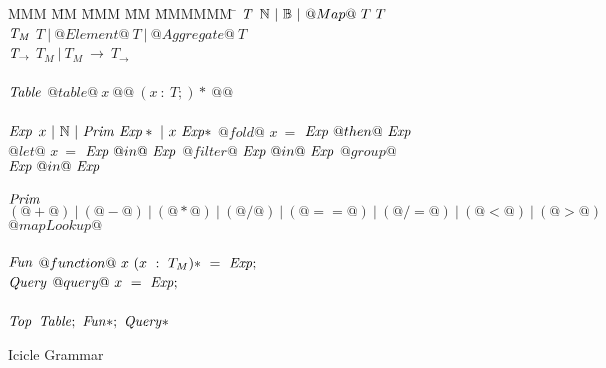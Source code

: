 
\begin{figure}

\begin{tabbing}
MMM \= MM \= MMM \= MM \= MMMMMM \= \kill
$\mathit{T}$
\GrammarDef
  $\mathbb{N}~|~\mathbb{B}~|~@Map@~T~T$
\\
$\mathit{T_M}$
\GrammarDef
  $T~|~@Element@~T~|~@Aggregate@~T$
\\
$\mathit{T_\to}$
\GrammarDef
  $T_M ~|~ T_M~\to~T_\to$
\\
\\

$\mathit{Table}$
\GrammarDef
  $@table@~x~@{@~(x~:~T;)*~@}@$
\\
\\

$\mathit{Exp}$
\GrammarDef
  $x~|~\mathbb{N}~|~\mathit{Prim}~\mathit{Exp}*~|~x~\mathit{Exp}*$
\GrammarAlt
  $@fold@$  \> $x~=$ \> $\mathit{Exp}~@then@~\mathit{Exp}$
\GrammarAlt
  $@let@$   \> $x~=$ \> $\mathit{Exp}~@  in@~\mathit{Exp}$
\GrammarAlt
  $@filter@$\> \> $\mathit{Exp}~@  in@~\mathit{Exp}$
\GrammarAlt
  $@group@$ \> \> $\mathit{Exp}~@  in@~\mathit{Exp}$
\\
\\

$\mathit{Prim}$
\GrammarDef
  $(@+@)~|~(@-@)~|~(@*@)~|~(@/@)~|~(@==@)~|~(@/=@)~|~(@<@)~|~(@>@)$
\GrammarAlt
  $@mapLookup@$
\\
\\


$\mathit{Fun}$
\GrammarDef
  $@function@~x~(x~:~T_M)*~=~\mathit{Exp};$
\\

$\mathit{Query}$
\GrammarDef
  $@query@~x~=~\mathit{Exp};$
\\
\\
$\mathit{Top}$
\GrammarDef
  $\mathit{Table};~\mathit{Fun}*;~\mathit{Query}*$
\end{tabbing}

\caption{Icicle Grammar}
\label{fig:source:grammar}
\end{figure}

